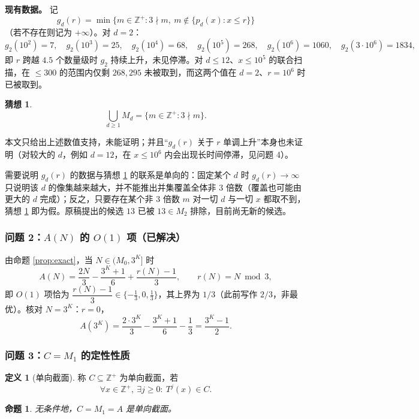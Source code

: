 \documentclass[11pt]{article}
\newtheorem{proposition}[theorem]{命题}
\theoremstyle{definition}
\newtheorem{definition}[theorem]{定义}
\theoremstyle{definition}
\newtheorem{conjecture}[theorem]{猜想}
\theoremstyle{remark}
\begin{document}
\textbf{现有数据。} 记
\[
g_d(r)=\min\{m\in\mathbb Z^+:3\nmid m,\ m\notin\{p_d(x):x\le r\}\}
\]
（若不存在则记为 \(+\infty\)）。对 \(d=2\)：
\[
g_2(10^2)=7,\quad g_2(10^3)=25,\quad g_2(10^4)=68,\quad g_2(10^5)=268,\quad g_2(10^6)=1060,\quad g_2(3\cdot10^6)=1834,
\]
即 \(r\) 跨越 \(4.5\) 个数量级时 \(g_2\) 持续上升，未见停滞。对 \(d\le12\)、\(x\le10^5\) 的联合扫描，在 \(\le300\) 的范围内仅剩 \(268,295\) 未被取到，而这两个值在 \(d=2\)、\(r=10^6\) 时已被取到。

\begin{conjecture}\label{conj:union}
\[
\bigcup_{d\ge1}M_d=\{m\in\mathbb Z^+:3\nmid m\}.
\]
\end{conjecture}

本文只给出上述数值支持，未能证明；并且“\(g_d(r)\) 关于 \(r\) 单调上升”本身也未证明（对较大的 \(d\)，例如 \(d=12\)，在 \(x\le10^6\) 内会出现长时间停滞，见问题 4）。

需要说明 \(g_d(r)\) 的数据与猜想 \ref{conj:union} 的联系是单向的：固定某个 \(d\) 时 \(g_d(r)\to\infty\) 只说明该 \(d\) 的像集越来越大，并不能推出并集覆盖全体非 3 倍数（覆盖也可能由更大的 \(d\) 完成）；反之，只要存在某个非 3 倍数 \(m\) 对一切 \(d\) 与一切 \(x\) 都取不到，猜想 \ref{conj:union} 即为假。原稿提出的候选 \(13\) 已被 \(13\in M_2\) 排除，目前尚无新的候选。

\subsubsection{问题 2：\(A(N)\) 的 \(O(1)\) 项（已解决）}

由命题 \ref{prop:exact}，当 \(N\in(M_0,3^K]\) 时
\[
A(N)=\frac{2N}{3}-\frac{3^K+1}{6}+\frac{r(N)-1}{3},\qquad r(N)=N\bmod3,
\]
即 \(O(1)\) 项恰为 \(\dfrac{r(N)-1}{3}\in\{-\frac13,0,\frac13\}\)，其上界为 \(1/3\)（此前写作 \(2/3\)，非最优）。核对 \(N=3^K\)：\(r=0\)，
\[
A(3^K)=\frac{2\cdot3^K}{3}-\frac{3^K+1}{6}-\frac13=\frac{3^K-1}{2}.
\]

\subsubsection{问题 3：\(C=M_1\) 的定性性质}

\begin{definition}[单向截面]
称 \(C\subseteq\mathbb Z^+\) 为单向截面，若
\[
\forall x\in\mathbb Z^+,\ \exists j\ge0:\ T^j(x)\in C.
\]
\end{definition}

\begin{proposition}\label{prop:onesided}
无条件地，\(C=M_1=A\) 是单向截面。
\end{proposition}
\end{document}
